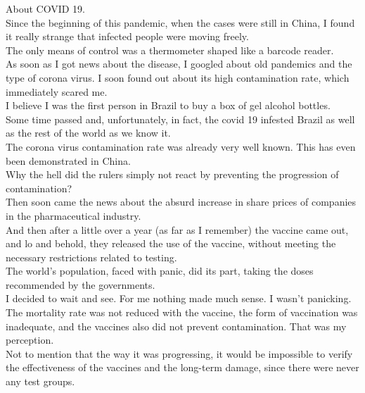 \documentclass{book}
\begin{document}
About COVID 19. \\

Since the beginning of this pandemic, when the cases were still in China, I found it really strange that infected people were moving freely. \\

The only means of control was a thermometer shaped like a barcode reader. \\

As soon as I got news about the disease, I googled about old pandemics and the type of corona virus. I soon found out about its high contamination rate, which immediately scared me. \\

I believe I was the first person in Brazil to buy a box of gel alcohol bottles. \\

Some time passed and, unfortunately, in fact, the covid 19 infested Brazil as well as the rest of the world as we know it. \\

The corona virus contamination rate was already very well known. This has even been demonstrated in China. \\

Why the hell did the rulers simply not react by preventing the progression of contamination? \\

Then soon came the news about the absurd increase in share prices of companies in the pharmaceutical industry. \\

And then after a little over a year (as far as I remember) the vaccine came out, and lo and behold, they released the use of the vaccine, without meeting the necessary restrictions related to testing. \\

The world's population, faced with panic, did its part, taking the doses recommended by the governments. \\

I decided to wait and see. For me nothing made much sense. I wasn't panicking. The mortality rate was not reduced with the vaccine, the form of vaccination was inadequate, and the vaccines also did not prevent contamination. That was my perception. \\

Not to mention that the way it was progressing, it would be impossible to verify the effectiveness of the vaccines and the long-term damage, since there were never any test groups. \\
\end{document}
